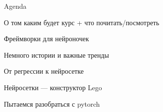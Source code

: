 \documentclass[notes,12pt, aspectratio=169]{beamer}
\newenvironment{wideitemize}{\itemize\addtolength{\itemsep}{10pt}}{\enditemize}
\begin{document}
{
	\begin{frame}
\end{frame}
}

\begin{frame}{Agenda}
\begin{wideitemize}
	\item  О том каким будет курс + что почитать/посмотреть
	\item  Фреймворки для нейроночек
	\item  Немного истории и важные тренды 
	\item  От регрессии к нейросетке
	\item  Нейросетки — конструктор Lego
	\item  Пытаемся разобраться с pytorch
\end{wideitemize} 
\end{frame}
\end{document}
